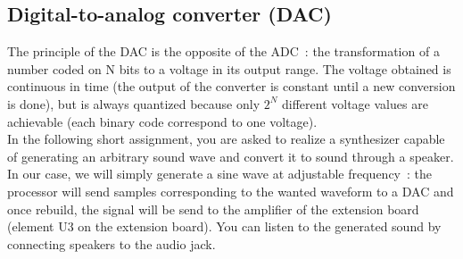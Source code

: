 




\newpage
\subsection{Digital-to-analog converter (DAC)}

The principle of the DAC is the opposite of the ADC~: the transformation of a number coded on N bits to a voltage in its output range.
The voltage obtained is continuous in time (the output of the converter is constant until a new conversion is done), but is always quantized because only $2^N$ different voltage values are achievable (each binary code correspond to one voltage).
\\
In the following short assignment, you are asked to realize a synthesizer capable of generating an arbitrary sound wave and convert it to sound through a speaker.
In our case, we will simply generate a sine wave at adjustable frequency~: the processor will send samples corresponding to the wanted waveform to a DAC and once rebuild, the signal will be send to the amplifier of the extension board (element U3 on the extension board). You can listen to the generated sound by connecting speakers to the audio jack. 
